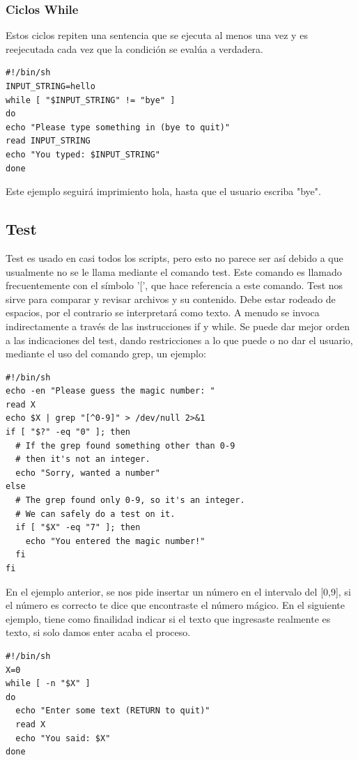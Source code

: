 \documentclass[12pt]{article}
\begin{document}
\subsubsection*{Ciclos While}
Estos ciclos repiten una sentencia que se ejecuta al menos una vez y es reejecutada cada vez que la condición se evalúa a verdadera.
\begin{verbatim}
#!/bin/sh
INPUT_STRING=hello
while [ "$INPUT_STRING" != "bye" ]
do
echo "Please type something in (bye to quit)"
read INPUT_STRING
echo "You typed: $INPUT_STRING"
done
\end{verbatim}
Este ejemplo seguirá imprimiento hola, hasta que el usuario escriba "bye".

\subsection*{Test}
Test es usado en casi todos los scripts, pero esto no parece ser así debido a que usualmente no se le llama mediante el comando test. Este comando es llamado frecuentemente con el símbolo ’[’, que hace referencia a este comando. Test nos sirve para comparar y revisar archivos y su contenido. Debe estar rodeado de espacios, por el contrario se interpretará como texto. A menudo se invoca indirectamente a través de las instrucciones if y while. Se puede dar mejor orden a las indicaciones del test, dando restricciones a lo que puede
o no dar el usuario, mediante el uso del comando grep, un ejemplo:
\begin{verbatim}
#!/bin/sh
echo -en "Please guess the magic number: "
read X
echo $X | grep "[^0-9]" > /dev/null 2>&1
if [ "$?" -eq "0" ]; then
  # If the grep found something other than 0-9
  # then it's not an integer.
  echo "Sorry, wanted a number"
else
  # The grep found only 0-9, so it's an integer. 
  # We can safely do a test on it.
  if [ "$X" -eq "7" ]; then
    echo "You entered the magic number!"
  fi
fi
\end{verbatim}
En el ejemplo anterior, se nos pide insertar un número en el intervalo del [0,9], si el número es correcto te dice que encontraste el número mágico. En el siguiente ejemplo, tiene como finailidad indicar si el texto que ingresaste realmente es texto, si solo damos enter acaba el proceso.
\begin{verbatim}
#!/bin/sh
X=0
while [ -n "$X" ]
do
  echo "Enter some text (RETURN to quit)"
  read X
  echo "You said: $X"
done
\end{verbatim}
\end{document}
